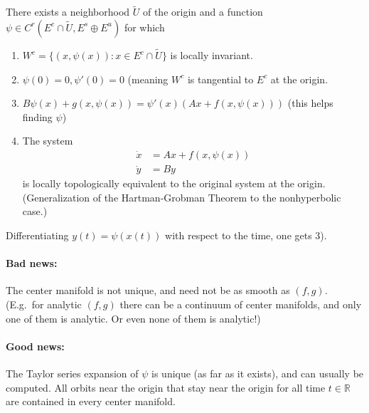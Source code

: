 \documentclass{article}
\newcommand*{\R}{\mathbb{R}}
\begin{document}
\begin{thm}
    There exists a neighborhood $\tilde U$ of the origin and a function $\psi \in C^r(E^c\cap \tilde U,E^s\oplus E^u)$ for which
    \begin{enumerate}
        \item $W^c = \{(x,\psi(x)): x\in E^c\cap \tilde U\}$ is locally invariant.

        \item $\psi(0) = 0, \psi'(0) = 0$ (meaning $W^c$ is tangential to $E^c$ at the origin.

        \item $B\psi(x)+g(x,\psi(x)) = \psi'(x)(Ax+f(x,\psi(x)))$ (this helps finding $\psi$)

        \item The system
        $$\begin{aligned}
            \dot x &= Ax +f(x,\psi(x))\\
            \dot y &= By
        \end{aligned}$$
        is locally topologically equivalent to the original system at the origin. (Generalization of the Hartman-Grobman Theorem to the nonhyperbolic case.)
    \end{enumerate}
\end{thm}

\begin{rem}
    Differentiating $y(t)=\psi(x(t))$ with respect to the time, one gets 3).
\end{rem}

\paragraph{Bad news:}
The center manifold is not unique, and need not be as smooth as $(f,g)$. (E.g.\ for analytic $(f,g)$ there can be a continuum of center manifolds, and only one of them is analytic. Or even none of them is analytic!)

\paragraph{Good news:}
The Taylor series expansion of $\psi$ is unique (as far as it exists), and can usually be computed. All orbits near the origin that stay near the origin for all time $t\in\R$ are contained in every center manifold.
\end{document}
